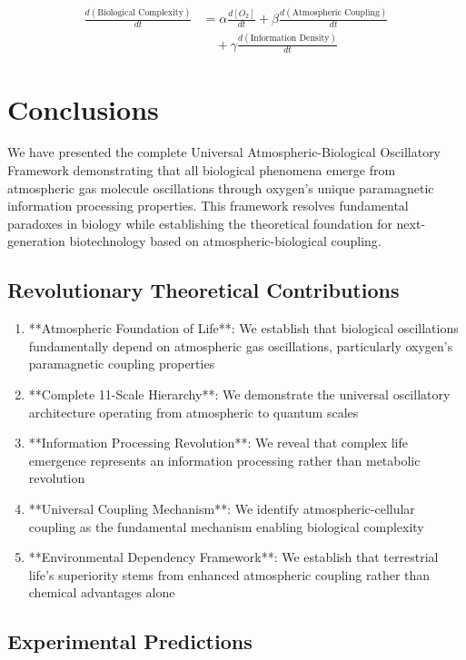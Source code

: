 \documentclass[twocolumn]{article}
\begin{document}
{\begin{align}
\frac{d(\text{Biological Complexity})}{dt} &= \alpha \frac{d[O_2]}{dt} + \beta \frac{d(\text{Atmospheric Coupling})}{dt} \\
&\quad + \gamma \frac{d(\text{Information Density})}{dt}
\end{align}

\section{Conclusions}

We have presented the complete Universal Atmospheric-Biological Oscillatory Framework demonstrating that all biological phenomena emerge from atmospheric gas molecule oscillations through oxygen's unique paramagnetic information processing properties. This framework resolves fundamental paradoxes in biology while establishing the theoretical foundation for next-generation biotechnology based on atmospheric-biological coupling.

\subsection{Revolutionary Theoretical Contributions}

\begin{enumerate}
\item **Atmospheric Foundation of Life**: We establish that biological oscillations fundamentally depend on atmospheric gas oscillations, particularly oxygen's paramagnetic coupling properties
\item **Complete 11-Scale Hierarchy**: We demonstrate the universal oscillatory architecture operating from atmospheric to quantum scales
\item **Information Processing Revolution**: We reveal that complex life emergence represents an information processing rather than metabolic revolution
\item **Universal Coupling Mechanism**: We identify atmospheric-cellular coupling as the fundamental mechanism enabling biological complexity
\item **Environmental Dependency Framework**: We establish that terrestrial life's superiority stems from enhanced atmospheric coupling rather than chemical advantages alone
\end{enumerate}

\subsection{Experimental Predictions}

}
\end{document}
